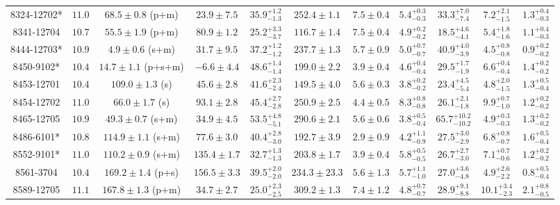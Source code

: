 \begin{landscape}
\begin{longtable}{ccccccccccc}
8324-12702* & $11.0$  & $68.5 \pm 0.8$ (p+m)  & $23.9 \pm 7.5$ & $35.9^{+1.2}_{-1.3}$  & $252.4 \pm 1.1 $ & $7.5 \pm 0.4 $ & $5.4^{+0.3}_{-0.3}$  & $33.3^{+7.0}_{-7.4}$  & $7.2^{+2.1}_{-1.5}$  & $1.3^{+0.4}_{-0.3}$ \\ 
8341-12704 & $10.7$  & $55.5 \pm 1.9$ (p+m)  & $80.9 \pm 1.2$ & $25.2^{+3.3}_{-3.7}$  & $116.7 \pm 1.4 $ & $7.5 \pm 0.4 $ & $4.9^{+0.2}_{-0.2}$  & $18.5^{+4.6}_{-4.1}$  & $5.4^{+1.8}_{-1.6}$  & $1.1^{+0.4}_{-0.3}$ \\ 
8444-12703* & $10.9$  & $4.9 \pm 0.6$ (s+m)  & $31.7 \pm 9.5$ & $37.2^{+1.2}_{-1.2}$  & $237.7 \pm 1.3 $ & $5.7 \pm 0.9 $ & $5.0^{+0.7}_{-0.7}$  & $40.9^{+4.0}_{-3.9}$  & $4.5^{+0.8}_{-0.8}$  & $0.9^{+0.2}_{-0.2}$ \\ 
8450-9102* & $10.4$  & $14.7 \pm 1.1$ (p+s+m)  & $-6.6 \pm 4.4$ & $48.6^{+1.4}_{-1.4}$  & $199.0 \pm 2.2 $ & $3.9 \pm 0.4 $ & $4.6^{+0.4}_{-0.4}$  & $29.5^{+1.7}_{-1.9}$  & $6.6^{+0.4}_{-0.4}$  & $1.4^{+0.2}_{-0.2}$ \\ 
8453-12701 & $10.4$  & $109.0 \pm 1.3$ (s)  & $45.6 \pm 2.8$ & $41.6^{+2.3}_{-2.4}$  & $149.5 \pm 4.0 $ & $5.6 \pm 0.3 $ & $3.8^{+0.2}_{-0.2}$  & $23.4^{+4.5}_{-5.4}$  & $4.8^{+2.0}_{-1.5}$  & $1.3^{+0.5}_{-0.4}$ \\ 
8454-12702 & $11.0$  & $66.0 \pm 1.7$ (s)  & $93.1 \pm 2.8$ & $45.4^{+2.7}_{-2.8}$  & $250.9 \pm 2.5 $ & $4.4 \pm 0.5 $ & $8.3^{+0.8}_{-0.8}$  & $26.1^{+2.1}_{-1.8}$  & $9.9^{+0.7}_{-1.0}$  & $1.2^{+0.2}_{-0.2}$ \\ 
8465-12705 & $10.9$  & $49.3 \pm 0.7$ (s+m)  & $34.9 \pm 4.5$ & $53.5^{+4.8}_{-5.1}$  & $290.6 \pm 2.1 $ & $5.6 \pm 0.6 $ & $3.8^{+0.5}_{-0.4}$  & $65.7^{+10.2}_{-10.2}$  & $4.9^{+0.3}_{-0.3}$  & $1.3^{+0.2}_{-0.2}$ \\ 
8486-6101* & $10.8$  & $114.9 \pm 1.1$ (s+m)  & $77.6 \pm 3.0$ & $40.4^{+2.8}_{-3.0}$  & $192.7 \pm 3.9 $ & $2.9 \pm 0.9 $ & $4.2^{+1.1}_{-0.9}$  & $27.5^{+3.0}_{-2.9}$  & $6.8^{+0.8}_{-0.7}$  & $1.6^{+0.5}_{-0.4}$ \\ 
8552-9101* & $11.0$  & $110.2 \pm 0.9$ (s+m)  & $135.4 \pm 1.7$ & $32.7^{+1.3}_{-1.3}$  & $203.8 \pm 1.7 $ & $3.9 \pm 0.4 $ & $5.8^{+0.5}_{-0.5}$  & $26.7^{+2.7}_{-3.0}$  & $7.1^{+0.7}_{-0.6}$  & $1.2^{+0.2}_{-0.2}$ \\ 
8561-3704 & $10.4$  & $169.2 \pm 1.4$ (p+s)  & $156.5 \pm 3.3$ & $39.5^{+2.0}_{-2.0}$  & $234.3 \pm 23.3 $ & $5.6 \pm 1.3 $ & $5.7^{+1.1}_{-1.0}$  & $27.0^{+3.6}_{-4.8}$  & $4.9^{+2.6}_{-2.2}$  & $0.8^{+0.5}_{-0.4}$ \\ 
8589-12705 & $11.1$  & $167.8 \pm 1.3$ (p+m)  & $34.7 \pm 2.7$ & $25.0^{+2.3}_{-2.5}$  & $309.2 \pm 1.3 $ & $7.4 \pm 1.2 $ & $4.8^{+0.7}_{-0.7}$  & $28.9^{+9.1}_{-8.8}$  & $10.1^{+3.4}_{-2.3}$  & $2.1^{+0.8}_{-0.5}$ \\ 

\end{longtable}
\end{landscape}
